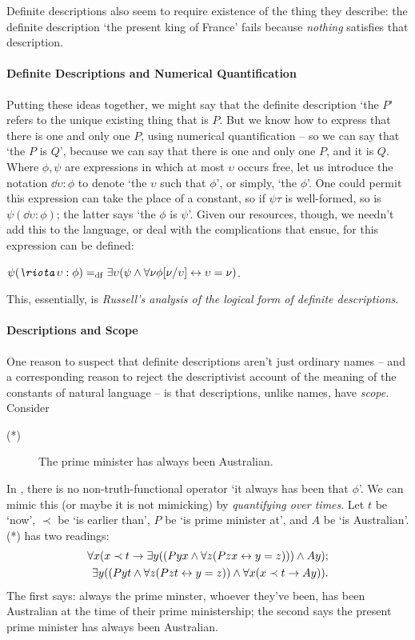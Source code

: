Definite descriptions also seem to require existence of the thing they describe: the definite description `the present king of France' fails because \emph{nothing} satisfies that description.

\paragraph{Definite Descriptions and Numerical Quantification}

Putting these ideas together, we might say that the definite description `the $P$' refers to the unique existing thing that is $P$. But we know how to express that there is one and only one $P$, using numerical quantification – so we can say that `the $P$ is $Q$', because we can say that there is one and only one $P$, and it is $Q$. Where $\phi,\psi$ are expressions in which at most $\upsilon$ occurs free, let us introduce the notation $\dd \upsilon: \phi$ to denote `the $\upsilon$ such that $\phi$', or simply, `the $\phi$'. One could permit this expression can take the place of a constant, so if $\psi\tau$ is well-formed, so is $\psi(\dd \upsilon: \phi)$; the latter says `the $\phi$ is $\psi$'. Given our resources, though, we needn't add this to the language, or deal with the complications that ensue, for this expression can be defined:  \begin{definition}
	$\psi(\dd \upsilon: \phi) \eqdf \exists \upsilon (\psi \wedge \forall \nu \phi[\nu/\upsilon] \bicond \upsilon=\nu)$.
\end{definition}
This, essentially, is \emph{Russell's analysis of the logical form of definite descriptions}. 

\paragraph{Descriptions and Scope}

One reason to suspect that definite descriptions aren't just ordinary names – and a corresponding reason to reject the descriptivist account of the meaning of the constants of natural language – is that descriptions, unlike names, have \emph{scope}. Consider \begin{description}
	\item [(*)]  The prime minister has always been Australian.
\end{description} In \lequ, there is no non-truth-functional operator `it always has been that $\phi$'. We can mimic this (or maybe it is not mimicking) by \emph{quantifying over times}. Let $t$ be `now', $\prec$ be `is earlier than', $P$ be `is prime minister at', and $A$ be `is Australian'. (*) has two readings: \begin{align*}
	\forall x (x \prec t \to \exists y ((Pyx \wedge \forall z (Pzx \leftrightarrow y=z)))\wedge Ay);\\
	\exists y ((Pyt \wedge \forall z (Pzt \leftrightarrow y=z))\wedge \forall x (x \prec t \to Ay)).
\end{align*} The first says: always the prime minster, whoever they've been, has been Australian at the time of their prime ministership; the second says the present prime minister has always been Australian.

